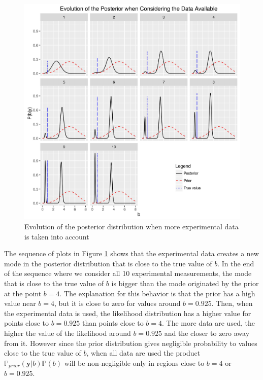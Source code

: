 \documentclass{sfuthesis}
\newcommand{\prior}{\mathbb{P}_{prior}}
\newcommand{\p}{\mathbb{P}}
\newcommand{\y}{\textbf{y}}
\begin{document}
\begin{figure}[H]
\centering
\includegraphics[scale=0.7]{./FigChap3/posterior_evolution}
\caption{Evolution of the posterior distribution when more experimental data is taken into account}
\label{figpostevolution}
\end{figure}

The sequence of plots in Figure \ref{figpostevolution} shows that the experimental data creates a new mode
in the posterior distribution that is close to the true value of $b$. In the end of the sequence where we consider
all 10 experimental measurements, the mode that is close to the true value of $b$ is bigger than the mode originated
by the prior at the point $b=4$. The explanation for this behavior  is that the prior  has a high value near $b=4$, 
but it is close to zero for values around $b=0.925$.
Then, when the experimental data is used, the likelihood distribution has a higher  value for points  close to $b=0.925$
than points close to $b=4$. The more data are used, the higher the value of the likelihood around $b=0.925$ and the closer to zero
away from it. However since
the prior distribution gives negligible probability to values close to the true value of $b$, when all data are used the 
product $\prior(\y|b)\p(b)$ will be non-negligible only in regions close to $b=4$ or $b=0.925$.
\end{document}
